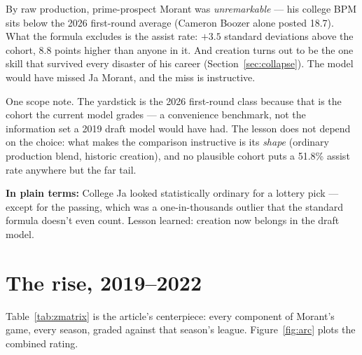 \documentclass[11pt]{article}
\newcommand{\plainbox}[1]{\par\medskip\noindent\begin{center}%
\colorbox{court!8}{\parbox{0.93\textwidth}{\small \textbf{\textcolor{court}{In plain terms:}} #1}}%
\end{center}\medskip}
\begin{document}
By raw production, prime-prospect Morant was \emph{unremarkable} --- his college BPM sits
below the 2026 first-round average (Cameron Boozer alone posted 18.7). What the formula
excludes is the assist rate: $+3.5$ standard deviations above the cohort, 8.8 points
higher than anyone in it. And creation turns out to be the one skill that survived every
disaster of his career (Section~\ref{sec:collapse}). The model would have missed Ja
Morant, and the miss is instructive.

One scope note. The yardstick is the 2026 first-round class because that is the cohort
the current model grades --- a convenience benchmark, not the information set a 2019
draft model would have had. The lesson does not depend on the choice: what makes the
comparison instructive is its \emph{shape} (ordinary production blend, historic
creation), and no plausible cohort puts a 51.8\% assist rate anywhere but the far tail.

\plainbox{College Ja looked statistically ordinary for a lottery pick --- except for the
passing, which was a one-in-thousands outlier that the standard formula doesn't even
count. Lesson learned: creation now belongs in the draft model.}

\section{The rise, 2019--2022}
\label{sec:rise}

Table~\ref{tab:zmatrix} is the article's centerpiece: every component of Morant's game,
every season, graded against that season's league. Figure~\ref{fig:arc} plots the
combined rating.
\end{document}

